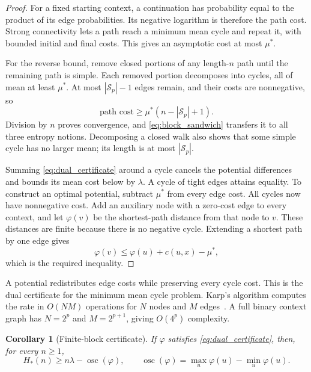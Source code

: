 \documentclass[11pt,a4paper]{article}
\newtheorem{corollary}[theorem]{Corollary}
\begin{document}
\begin{proof}
For a fixed starting context, a continuation has probability equal to
the product of its edge probabilities.  Its negative logarithm is
therefore the path cost.  Strong connectivity lets a path reach a
minimum mean cycle and repeat it, with bounded initial and final
costs.  This gives an asymptotic cost at most $\mu^*$.

For the reverse bound, remove closed portions of any length-$n$ path
until the remaining path is simple.  Each removed portion decomposes
into cycles, all of mean at least $\mu^*$.  At most
$|\mathcal S_p|-1$ edges remain, and their costs are nonnegative, so
\[
    \text{path cost}\ge\mu^*(n-|\mathcal S_p|+1).
\]
Division by $n$ proves convergence, and \eqref{eq:block_sandwich}
transfers it to all three entropy notions.  Decomposing a closed walk
also shows that some simple cycle has no larger mean; its length is
at most $|\mathcal S_p|$.

Summing \eqref{eq:dual_certificate} around a cycle cancels the
potential differences and bounds its mean cost below by $\lambda$.
A cycle of tight edges attains equality.  To construct an optimal
potential, subtract $\mu^*$ from every edge cost.  All cycles now
have nonnegative cost.  Add an auxiliary node with a zero-cost edge
to every context, and let $\varphi(v)$ be the shortest-path distance
from that node to $v$.  These distances are finite because there is
no negative cycle.  Extending a shortest path by one edge gives
\[
    \varphi(v)\le\varphi(u)+c(u,x)-\mu^*,
\]
which is the required inequality.
\end{proof}

A potential redistributes edge costs while preserving every cycle
cost.  This is the dual certificate for the minimum mean cycle problem.
Karp's algorithm computes the rate in $O(NM)$ operations for $N$
nodes and $M$ edges~\cite{karp1978characterization}.  A full binary
context graph has $N=2^p$ and $M=2^{p+1}$, giving $O(4^p)$ complexity.

\begin{corollary}[Finite-block certificate]
\label{cor:finite_block_certificate}
If $\varphi$ satisfies \eqref{eq:dual_certificate}, then, for every
$n\ge1$,
\begin{equation}
\label{eq:finite_block_certificate}
    H_*(n)\ge n\lambda-\operatorname{osc}(\varphi),
    \qquad
    \operatorname{osc}(\varphi)=\max_u\varphi(u)-\min_u\varphi(u).
\end{equation}
\end{corollary}
\end{document}
